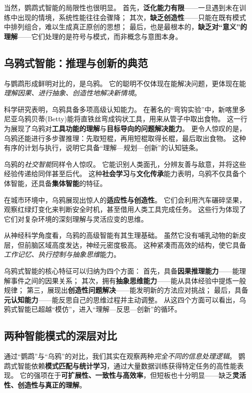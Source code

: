 当然，鹦鹉式智能的局限性也很明显。  
首先，\textbf{泛化能力有限}——一旦遇到未在训练中出现的情境，系统性能往往会骤降；  
其次，\textbf{缺乏创造性}——只能在既有模式中排列组合，难以生成真正原创的思想；  
最后，也是最根本的，\textbf{缺乏对“意义”的理解}——它们处理的是符号与模式，而非概念与意图本身。  

\subsection{乌鸦式智能：推理与创新的典范}  

与鹦鹉形成鲜明对比的，是乌鸦。  
它的聪明不仅体现在能解决问题，更体现在能\emph{理解因果、进行抽象、创造性地解决新情境}。  

科学研究表明，乌鸦具备多项高级认知能力。  
在著名的“弯钩实验”中，新喀里多尼亚乌鸦贝蒂(Betty)能将直铁丝弯成钩状工具，用来从管子中取出食物。  
这一行为展现了乌鸦对\textbf{工具功能的理解}与\textbf{目标导向的问题解决能力}。  
更令人惊叹的是，乌鸦还能进行多步骤推理：先取短棍，再用短棍取得长棍，最后取出食物。  
这种有序的计划与执行，说明它具备“理解—规划—创新”的认知链条。

乌鸦的\emph{社交智能}同样令人惊叹。  
它能识别人类面孔，分辨友善与敌意，并将这些经验传递给同伴甚至后代。  
这种\textbf{社会学习}与\textbf{文化传承}能力表明，乌鸦不仅具备个体智能，还具备\textbf{集体智能}的特征。  

在城市环境中，乌鸦展现出惊人的\textbf{适应性与创造性}。  
它们会利用汽车碾碎坚果，观察红绿灯变化来判断安全时机，甚至借用人类工具完成任务。  
这些行为体现了它们对复杂环境的深刻理解与灵活应变的思维。  

从神经科学角度看，乌鸦的高级智能有其生理基础。  
虽然它没有哺乳动物的新皮层，但前脑区域高度发达，神经元密度极高。  
这种紧凑而高效的结构，使它具备\emph{工作记忆、执行控制与抽象思维}能力。  

乌鸦式智能的核心特征可以归纳为四个方面：  
首先，具备\textbf{因果推理能力}——能理解事件之间的因果关系；  
其次，拥有\textbf{抽象思维能力}——能从具体经验中提炼一般规律；  
第三，展现出\textbf{创造性问题解决}——能发明新的方法应对挑战；  
最后，具备\textbf{元认知能力}——能反思自己的思维过程并主动调整。  
从这四个方面可以看出，乌鸦式智能已超越“模仿”，进入“理解—反思—创新”的循环。  

\subsection{两种智能模式的深层对比}

通过“鹦鹉”与“乌鸦”的对比，我们其实在观察两种\emph{完全不同的信息处理逻辑}。  
鹦鹉式智能依赖\textbf{模式匹配与统计学习}，通过大量数据训练获得特定任务的高性能表现。  
它的强项在于\textbf{可扩展性、一致性与高效率}，但短板也十分明显——缺乏\textbf{灵活性、创造性与真正的理解}。  


